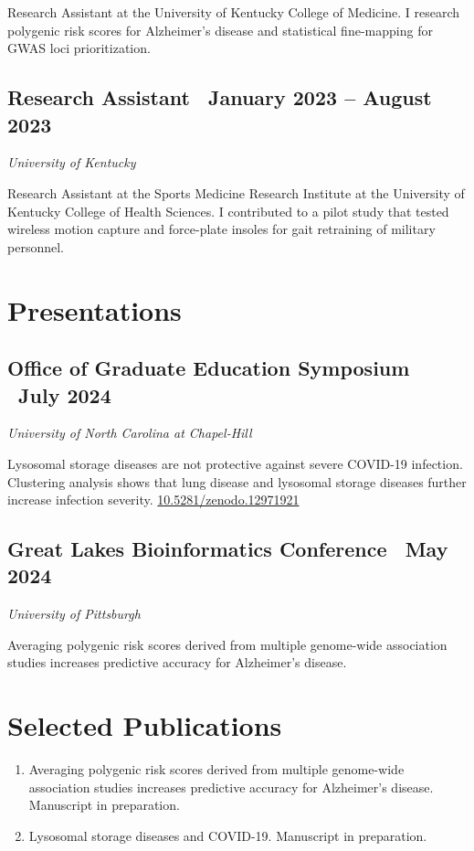\documentclass{article}
\begin{document}
\begin{flushleft}
Research Assistant at the University of Kentucky College of Medicine. I research polygenic risk scores for 
Alzheimer's disease and statistical fine-mapping for GWAS loci prioritization.

\subsection*{Research Assistant {\hfill\normalsize\normalfont\ January 2023 -- August 2023}}
\textit{University of Kentucky \vspace{0.5em}}

Research Assistant at the Sports Medicine Research Institute at the University of Kentucky College of Health Sciences. 
I contributed to a pilot study that tested wireless motion capture and force-plate insoles for gait retraining of military
personnel. 

\section*{Presentations}
\subsection*{Office of Graduate Education Symposium {\hfill\normalsize\normalfont\ July 2024}}
\textit{University of North Carolina at Chapel-Hill}

Lysosomal storage diseases are not protective against severe COVID-19 infection. Clustering analysis shows that lung disease and lysosomal storage diseases further increase 
infection severity. \href{https://doi.org/10.5281/zenodo.12971921}{10.5281/zenodo.12971921}

\subsection*{Great Lakes Bioinformatics Conference {\hfill\normalsize\normalfont\ May 2024}}
\textit{University of Pittsburgh \vspace{0.5em}}

Averaging polygenic risk scores derived from multiple genome-wide association studies increases predictive accuracy for Alzheimer’s disease.

\section*{Selected Publications}
\begin{enumerate}
\item Averaging polygenic risk scores derived from multiple genome-wide association studies increases predictive accuracy for Alzheimer’s disease. Manuscript in preparation.
\item Lysosomal storage diseases and COVID-19. Manuscript in preparation.
\end{enumerate}


\end{flushleft}
\end{document}
